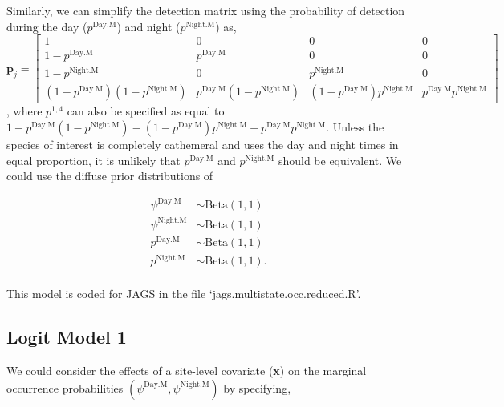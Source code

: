 \documentclass[12pt]{article}
\begin{document}
Similarly, we can simplify the detection matrix using the probability of detection during the day  ($p^{\text{Day.M}}$) and night ($p^{\text{Night.M}}$) as,
\begin{equation}
\boldsymbol{p}_{j} = \begin{bmatrix} 1 & 0 & 0 & 0 \\ 
									1-p^{\text{Day.M}} & p^{\text{Day.M}} & 0 & 0 \\ 
									1-p^{\text{Night.M}} & 0 & p^{\text{Night.M}} & 0\\
  								      (1-p^{\text{Day.M}})(1-p^{\text{Night.M}}) & p^{\text{Day.M}}(1-p^{\text{Night.M}}) & (1-p^{\text{Day.M}})p^{\text{Night.M}} & p^{\text{Day.M}}p^{\text{Night.M}}
  								      \end{bmatrix}
\end{equation}
, where $p^{1,4}$ can also be specified as equal to $1- p^{\text{Day.M}}(1-p^{\text{Night.M}}) - (1-p^{\text{Day.M}})p^{\text{Night.M}} - p^{\text{Day.M}}p^{\text{Night.M}}$. Unless the species of interest is completely cathemeral and uses the day and night times in equal proportion, it is unlikely that $p^{\text{Day.M}}$ and $p^{\text{Night.M}}$ should be equivalent. We could use the diffuse prior distributions of 
\begin{center}
\begin{align*}
\psi^{\text{Day.M}} &\sim \text{Beta}(1,1)\\
\psi^{\text{Night.M}} &\sim \text{Beta}(1,1)\\
p^{\text{Day.M}} &\sim \text{Beta}(1,1)\\
p^{\text{Night.M}} &\sim \text{Beta}(1,1).\\
\end{align*}
\end{center}
This model is coded for JAGS in the file `jags.multistate.occ.reduced.R'.

\subsection{Logit Model 1}
We could consider the effects of a site-level covariate (\textbf{x}) on the marginal occurrence probabilities $(\psi^{\text{Day.M}}, \psi^{\text{Night.M}})$ by specifying,
\end{document}
